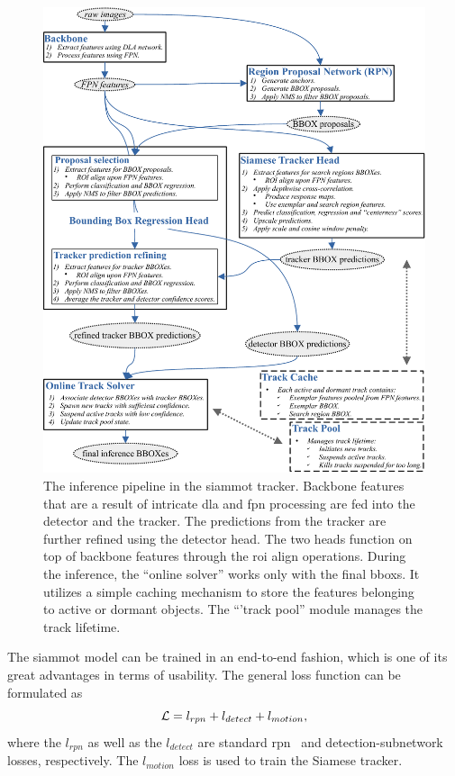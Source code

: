 \begin{figure}[H]
    \centering
    \includegraphics[width=\linewidth]{figures/siamese_tracking/siammot_inference_diagram.pdf}
    \caption[\gls{siammot} inference diagram]{The inference pipeline in the \gls{siammot} tracker. Backbone features that are a result of intricate \gls{dla} and \gls{fpn} processing are fed into the detector and the tracker. The predictions from the tracker are further refined using the detector head. The two heads function on top of backbone features through the \gls{roi} align operations. During the inference, the ``online solver'' works only with the final \glspl{bbox}. It utilizes a simple caching mechanism to store the features belonging to active or dormant objects. The ``'track pool'' module manages the track lifetime.}
    \label{fig:SiamMOTInference}
\end{figure}

The \gls{siammot} model can be trained in an end-to-end fashion, which is one of its great advantages in terms of usability. The general loss function can be formulated as
\begin{equation}
    \label{eq:SiamMOTGeneralLoss}
    \mathcal{L} = l_{rpn} + l_{detect} + l_{motion},
\end{equation}
where the $l_{rpn}$ as well as the $l_{detect}$ are standard \gls{rpn}~\cite{ren2017fasterrcnn} and detection-subnetwork~\cite{girshick2015fast} losses, respectively. The $l_{motion}$ loss is used to train the Siamese tracker.

